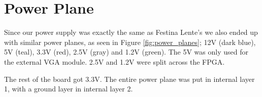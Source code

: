 \section {Power Plane}



Since our power supply was exactly the same as Festina Lente's we also ended up
with similar power planes, as seen in Figure \ref{fig:power_planes}; 12V (dark blue), 5V (teal), 
3.3V (red), 2.5V (gray) and 1.2V (green). The 5V was only used for the external 
\ac{VGA} module. 2.5V and 1.2V were split across the \ac{FPGA}.

The rest of the board got 3.3V. The entire power plane was put in internal layer
1, with a ground layer in internal layer 2.
